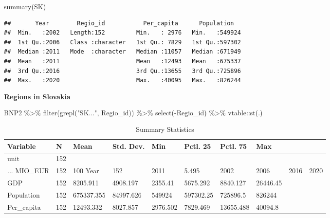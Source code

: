 \documentclass[
]{article}
\newenvironment{Shaded}{\begin{snugshade}}{\end{snugshade}}
\newcommand{\FunctionTok}[1]{\textcolor[rgb]{0.00,0.00,0.00}{#1}}
\newcommand{\NormalTok}[1]{#1}
\newcommand{\SpecialCharTok}[1]{\textcolor[rgb]{0.00,0.00,0.00}{#1}}
\newcommand{\StringTok}[1]{\textcolor[rgb]{0.31,0.60,0.02}{#1}}
\begin{document}
\begin{Shaded}
\begin{Highlighting}[]
\FunctionTok{summary}\NormalTok{(SK)}
\end{Highlighting}
\end{Shaded}

\begin{verbatim}
##       Year        Regio_id           Per_capita      Population    
##  Min.   :2002   Length:152         Min.   : 2976   Min.   :549924  
##  1st Qu.:2006   Class :character   1st Qu.: 7829   1st Qu.:597302  
##  Median :2011   Mode  :character   Median :11057   Median :671949  
##  Mean   :2011                      Mean   :12493   Mean   :675337  
##  3rd Qu.:2016                      3rd Qu.:13655   3rd Qu.:725896  
##  Max.   :2020                      Max.   :40095   Max.   :826244
\end{verbatim}

\textbf{Regions in Slovakia}

\begin{Shaded}
\begin{Highlighting}[]
\NormalTok{BNP2 }\SpecialCharTok{\%\textgreater{}\%}
  \FunctionTok{filter}\NormalTok{(}\FunctionTok{grepl}\NormalTok{(}\StringTok{"SK..."}\NormalTok{, Regio\_id)) }\SpecialCharTok{\%\textgreater{}\%}
  \FunctionTok{select}\NormalTok{(}\SpecialCharTok{{-}}\NormalTok{Regio\_id) }\SpecialCharTok{\%\textgreater{}\%}
\NormalTok{  vtable}\SpecialCharTok{::}\FunctionTok{st}\NormalTok{(.)}
\end{Highlighting}
\end{Shaded}

\begin{table}

\caption{\label{tab:unnamed-chunk-12}Summary Statistics}
\centering
\begin{tabular}[t]{llllllll}
\toprule
Variable & N & Mean & Std. Dev. & Min & Pctl. 25 & Pctl. 75 & Max\\
\midrule
unit & 152 &  &  &  &  &  & \\
... MIO_EUR & 152 & 100%
Year & 152 & 2011 & 5.495 & 2002 & 2006 & 2016 & 2020\\
GDP & 152 & 8205.911 & 4908.197 & 2355.41 & 5675.292 & 8840.127 & 26446.45\\
Population & 152 & 675337.355 & 84997.626 & 549924 & 597302.25 & 725896.5 & 826244\\
\addlinespace
Per_capita & 152 & 12493.332 & 8027.857 & 2976.502 & 7829.469 & 13655.488 & 40094.8\\
\bottomrule
\end{tabular}
\end{table}
\end{document}
